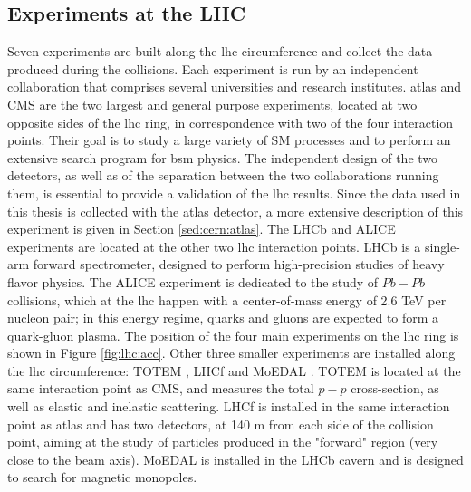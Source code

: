 \subsection{Experiments at the LHC}

Seven experiments are built along the \gls{lhc} circumference and collect the data produced during the collisions. Each experiment is run by an independent collaboration that comprises several universities and research institutes. 
\gls{atlas} \cite{atlas:atlas} and CMS \cite{cms:cms} are the two largest and general purpose experiments, located at two opposite sides of the \gls{lhc} ring, in correspondence with two of the four interaction points. Their goal is to study a large variety of SM processes and to perform an extensive search program for \gls{bsm} physics. The independent design of the two detectors, as well as of the separation between the two collaborations running them, is essential to provide a validation of the \gls{lhc} results. Since the data used in this thesis is collected with the \gls{atlas} detector, a more extensive description of this experiment is given in Section \ref{sed:cern:atlas}. 
The LHCb \cite{lhcb:lhcb} and ALICE \cite{alice:alice} experiments are located at the other two \gls{lhc} interaction points. LHCb is a single-arm forward spectrometer, designed to perform high-precision studies of heavy flavor physics. The ALICE experiment is dedicated to the study of $Pb-Pb$ collisions, which at the \gls{lhc} happen with a center-of-mass energy of 2.6 TeV per nucleon pair; in this energy regime, quarks and gluons are expected to form a quark-gluon plasma.
The position of the four main experiments on the \gls{lhc} ring is shown in Figure \ref{fig:lhc:acc}.
Other three smaller experiments are installed along the \gls{lhc} circumference: TOTEM \cite{totem:totem}, LHCf \cite{lhcf:lhcf} and MoEDAL \cite{moedal:moedal}. TOTEM is located at the same interaction point as CMS, and measures the total $p-p$ cross-section, as well as elastic and inelastic scattering. LHCf is installed in the same interaction point as \gls{atlas} and has two detectors, at 140 m from each side of the collision point, aiming at the study of particles produced in the "forward" region (very close to the beam axis). MoEDAL is installed in the LHCb cavern and is designed to search for magnetic monopoles.  





